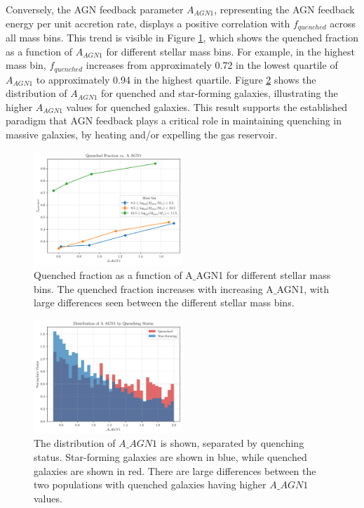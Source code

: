 \documentclass[twocolumn]{aastex631}
\begin{document}
Conversely, the AGN feedback parameter \(A_{AGN1}\), representing the AGN feedback energy per unit accretion rate, displays a positive correlation with \(f_{quenched}\) across all mass bins. This trend is visible in Figure \ref{fig:fquenched_AAGN1}, which shows the quenched fraction as a function of $A_{AGN1}$ for different stellar mass bins. For example, in the highest mass bin, \(f_{quenched}\) increases from approximately 0.72 in the lowest quartile of \(A_{AGN1}\) to approximately 0.94 in the highest quartile. Figure \ref{fig:AAGN1_hist} shows the distribution of $A_{AGN1}$ for quenched and star-forming galaxies, illustrating the higher $A_{AGN1}$ values for quenched galaxies. This result supports the established paradigm that AGN feedback plays a critical role in maintaining quenching in massive galaxies, by heating and/or expelling the gas reservoir.

\begin{figure}[h!]
    \centering
    \includegraphics[width=0.5\textwidth]{../Project6/plots/fquenched_vs_A_AGN1_20250424_133935.png}
    \caption{\label{fig:fquenched_AAGN1} Quenched fraction as a function of A\ensuremath{\_}AGN1 for different stellar mass bins. The quenched fraction increases with increasing A\ensuremath{\_}AGN1, with large differences seen between the different stellar mass bins.
}
\end{figure}

\begin{figure}[h!]
    \centering
    \includegraphics[width=0.5\textwidth]{../Project6/plots/A_AGN1_histogram_5_20250424_133143.png}
    \caption{\label{fig:AAGN1_hist} The distribution of $A\_AGN1$ is shown, separated by quenching status. Star-forming galaxies are shown in blue, while quenched galaxies are shown in red. There are large differences between the two populations with quenched galaxies having higher $A\ensuremath{\_}AGN1$ values.
}
\end{figure}
\end{document}
